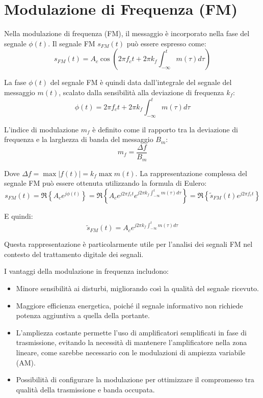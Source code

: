 \section*{Modulazione di Frequenza (FM)}

Nella modulazione di frequenza (FM), il messaggio è incorporato nella fase del segnale \( \phi(t) \). Il segnale FM \( s_{FM}(t) \) può essere espresso come:
\begin{equation}
    s_{FM}(t) = A_c \cos\left(2\pi f_c t + 2\pi k_f \int_{-\infty}^{t} m(\tau) d\tau \right)
\end{equation}

La fase \( \phi(t) \) del segnale FM è quindi data dall'integrale del segnale del messaggio \( m(t) \), scalato dalla sensibilità alla deviazione di frequenza \( k_f \):
\begin{equation}
    \phi(t) = 2\pi f_c t + 2\pi k_f \int_{-\infty}^{t} m(\tau) d\tau
\end{equation}

L'indice di modulazione \( m_f \) è definito come il rapporto tra la deviazione di frequenza e la larghezza di banda del messaggio \( B_m \):
\begin{equation}
    m_f = \frac{\Delta f}{B_m}
\end{equation}

Dove $\Delta f = \max |f(t)| = k_f \max m(t)$.
La rappresentazione complessa del segnale FM può essere ottenuta utilizzando la formula di Eulero:
\begin{equation}
    s_{FM}(t) = \Re \left\{ A_c e^{j\phi(t)} \right\} = \Re \left\{ A_c e^{j2\pi f_c t} e^{j2\pi k_f \int_{-\infty}^{t} m(\tau) d\tau} \right\} = \Re \left\{ \tilde{s}_{FM} (t) e^{j2\pi f_c t} \right\}
\end{equation}

E quindi:
\begin{equation}
    \tilde{s}_{FM}(t) = A_c e^{j2\pi k_f \int_{-\infty}^{t} m(\tau) d\tau}
\end{equation}

Questa rappresentazione è particolarmente utile per l'analisi dei segnali FM nel contesto del trattamento digitale dei segnali.

I vantaggi della modulazione in frequenza includono:
\begin{itemize}
    \item Minore sensibilità ai disturbi, migliorando così la qualità del segnale ricevuto.
    \item Maggiore efficienza energetica, poiché il segnale informativo non richiede potenza aggiuntiva a quella della portante.
    \item L'ampliezza costante permette l'uso di amplificatori semplificati in fase di trasmissione, evitando la necessità di mantenere l'amplificatore nella zona lineare, come sarebbe necessario con le modulazioni di ampiezza variabile (AM).
    \item Possibilità di configurare la modulazione per ottimizzare il compromesso tra qualità della trasmissione e banda occupata.
\end{itemize}



